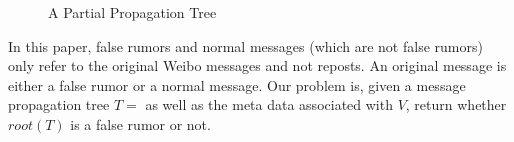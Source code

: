 \begin{figure}[th]
\centering
{}
\caption{A Partial Propagation Tree}
\label{fig:ptree}
\end{figure}

In this paper, false rumors and normal messages (which are not false rumors) only refer to the
original Weibo messages and not reposts.
An original message is either a false rumor or a normal message.
Our problem is, given a message propagation tree 
$T = $ as well
as the meta data associated with $V$, return whether $root(T)$ is
a false rumor or not.


